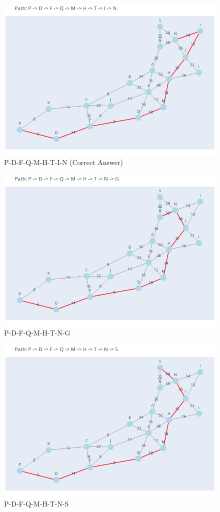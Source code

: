 \documentclass[11pt]{book}
\renewcommand{\=}[1]{\stackrel{#1}{=}} %
\theoremstyle{definition}
\theoremstyle{remark}
\begin{document}
\begin{figure}
    \centering
    \includegraphics[width=0.7\linewidth]{Plots/P_D_F_Q_M_H_T_I_N.png}
    \caption{P-D-F-Q-M-H-T-I-N (Correct Answer)}
    \label{fig:enter-label}
\end{figure}
\begin{figure}
    \centering
    \includegraphics[width=0.7\linewidth]{Plots/P_D_F_Q_M_H_T_N_G.png}
    \caption{P-D-F-Q-M-H-T-N-G}
    \label{fig:enter-label}
\end{figure}
\begin{figure}
    \centering
    \includegraphics[width=0.7\linewidth]{Plots/P_D_F_Q_M_H_T_N_S.png}
    \caption{P-D-F-Q-M-H-T-N-S}
    \label{fig:enter-label}
\end{figure}
\end{document}
